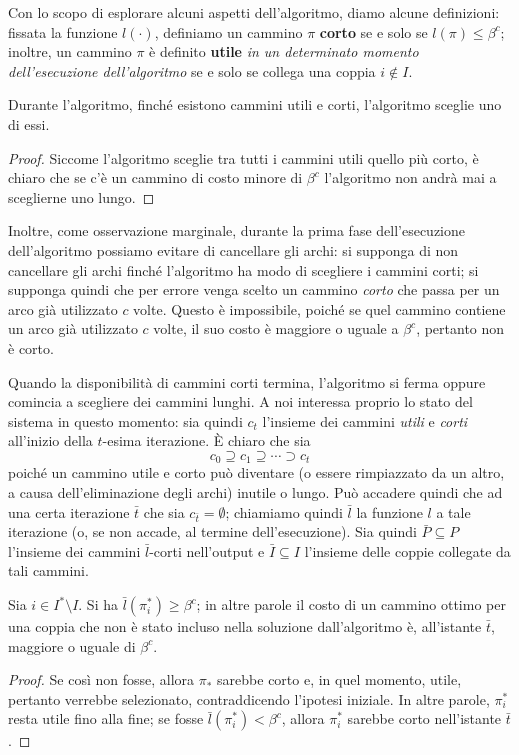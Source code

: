 \noindent
Con lo scopo di esplorare alcuni aspetti dell'algoritmo, diamo alcune
definizioni: fissata la funzione $l(\cdot)$, definiamo un cammino $\pi$
\textbf{corto} se e solo se $l(\pi) \leq \beta^c$; inoltre, un cammino $\pi$ è
definito \textbf{utile} \textit{in un determinato momento dell'esecuzione dell'algoritmo}
se e solo se collega una coppia $i \notin I$.

\begin{lemma}\label{lem:priceddpaths_su}
	Durante l'algoritmo, finché esistono cammini utili e corti,
	l'algoritmo sceglie uno di essi.
\end{lemma}
\begin{proof}
	Siccome l'algoritmo sceglie tra tutti i cammini utili quello più corto,
	è chiaro che se c'è un cammino di costo minore di $\beta^c$ l'algoritmo
	non andrà mai a sceglierne uno lungo.
\end{proof}

Inoltre, come osservazione marginale, durante la prima fase dell'esecuzione
dell'algoritmo possiamo evitare di cancellare gli archi: si supponga di non
cancellare gli archi finché l'algoritmo ha modo di scegliere i cammini corti;
si supponga quindi che per errore venga scelto un cammino \textit{corto}
che passa per un arco già utilizzato $c$ volte. Questo è impossibile, poiché
se quel cammino contiene un arco già utilizzato $c$ volte, il suo costo è
maggiore o uguale a $\beta^c$, pertanto non è corto.

Quando la disponibilità di cammini corti termina, l'algoritmo si ferma
oppure comincia a scegliere dei cammini lunghi. A noi interessa proprio lo
stato del sistema in questo momento: sia quindi $c_t$ l'insieme dei cammini
\textit{utili} e \textit{corti} all'inizio della $t$-esima
iterazione. \`E chiaro che sia
$$
	c_0 \supseteq c_1 \supseteq \cdots \supset c_{t}
$$
poiché un cammino utile e corto può diventare (o essere rimpiazzato da
un altro, a causa dell'eliminazione degli archi) inutile o lungo.
Può accadere quindi che ad una certa iterazione $\bar{t}$ che sia $c_{\bar{t}} = \emptyset$;
chiamiamo quindi $\bar{l}$ la funzione $l$ a tale iterazione (o, se non accade,
al termine dell'esecuzione). Sia quindi $\bar{P} \subseteq P$ l'insieme dei cammini $\bar{l}$-corti
nell'output e $\bar{I} \subseteq I$ l'insieme delle coppie collegate da tali cammini.

\begin{lemma}\label{lem:priceddpaths_non_included_non_short}
	Sia $i \in I^* \setminus I$. Si ha $\bar{l}(\pi_{i}^*) \geq \beta^c$; in altre
	parole il costo di un cammino ottimo per una coppia che non è stato incluso
	nella soluzione dall'algoritmo è, all'istante $\bar{t}$, maggiore o uguale
	di $\beta^c$.
\end{lemma}
\begin{proof}
	Se così non fosse, allora $\pi_*$ sarebbe corto e, in quel momento, utile,
	pertanto verrebbe selezionato, contraddicendo l'ipotesi iniziale.
	In altre parole, $\pi_{i}^*$ resta utile fino alla fine;
	se fosse $\bar{l}(\pi_i^*) < \beta^c$, allora $\pi_i^*$ sarebbe corto nell'istante $\bar{t}$.
\end{proof}

